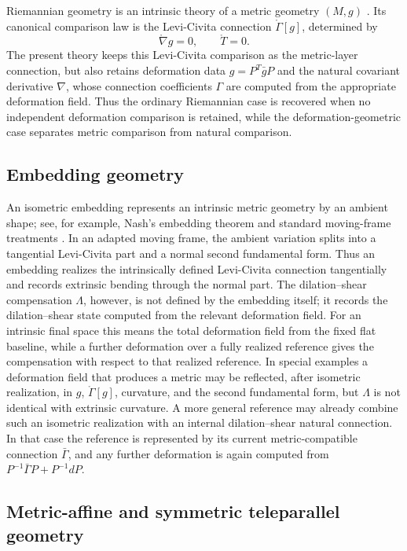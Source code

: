 \documentclass[12pt]{amsart}
\theoremstyle{definition}
\theoremstyle{remark}
\begin{document}
Riemannian geometry is an intrinsic theory of a metric geometry \((M,g)\) \cite{Lee,doCarmo}.  Its canonical comparison law is the Levi-Civita connection \(\mathring\Gamma[g]\), determined by
\begin{equation}
 \mathring\nabla g=0,\qquad \mathring T=0 .
\end{equation}
The present theory keeps this Levi-Civita comparison as the metric-layer connection, but also retains deformation data \(g=P^T\bar gP\) and the natural covariant derivative \(\nabla\), whose connection coefficients \(\Gamma\) are computed from the appropriate deformation field.  Thus the ordinary Riemannian case is recovered when no independent deformation comparison is retained, while the deformation-geometric case separates metric comparison from natural comparison.

\subsection{Embedding geometry}

An isometric embedding represents an intrinsic metric geometry by an ambient shape; see, for example, Nash's embedding theorem and standard moving-frame treatments \cite{Nash1956,SpivakVol2,KobayashiNomizu1}.  In an adapted moving frame, the ambient variation splits into a tangential Levi-Civita part and a normal second fundamental form.  Thus an embedding realizes the intrinsically defined Levi-Civita connection tangentially and records extrinsic bending through the normal part.  The dilation--shear compensation \(\Lambda\), however, is not defined by the embedding itself; it records the dilation--shear state computed from the relevant deformation field.  For an intrinsic final space this means the total deformation field from the fixed flat baseline, while a further deformation over a fully realized reference gives the compensation with respect to that realized reference.  In special examples a deformation field that produces a metric may be reflected, after isometric realization, in \(g\), \(\mathring\Gamma[g]\), curvature, and the second fundamental form, but \(\Lambda\) is not identical with extrinsic curvature.  A more general reference may already combine such an isometric realization with an internal dilation--shear natural connection.  In that case the reference is represented by its current metric-compatible connection \(\bar\Gamma\), and any further deformation is again computed from \(P^{-1}\bar\Gamma P+P^{-1}dP\).

\subsection{Metric-affine and symmetric teleparallel geometry}
\end{document}
